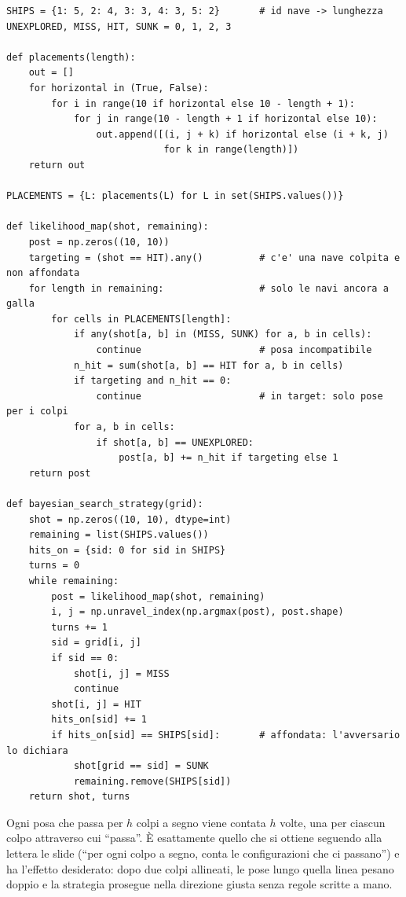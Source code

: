 \begin{lstlisting}
SHIPS = {1: 5, 2: 4, 3: 3, 4: 3, 5: 2}       # id nave -> lunghezza
UNEXPLORED, MISS, HIT, SUNK = 0, 1, 2, 3

def placements(length):
    out = []
    for horizontal in (True, False):
        for i in range(10 if horizontal else 10 - length + 1):
            for j in range(10 - length + 1 if horizontal else 10):
                out.append([(i, j + k) if horizontal else (i + k, j)
                            for k in range(length)])
    return out

PLACEMENTS = {L: placements(L) for L in set(SHIPS.values())}

def likelihood_map(shot, remaining):
    post = np.zeros((10, 10))
    targeting = (shot == HIT).any()          # c'e' una nave colpita e non affondata
    for length in remaining:                 # solo le navi ancora a galla
        for cells in PLACEMENTS[length]:
            if any(shot[a, b] in (MISS, SUNK) for a, b in cells):
                continue                     # posa incompatibile
            n_hit = sum(shot[a, b] == HIT for a, b in cells)
            if targeting and n_hit == 0:
                continue                     # in target: solo pose per i colpi
            for a, b in cells:
                if shot[a, b] == UNEXPLORED:
                    post[a, b] += n_hit if targeting else 1
    return post

def bayesian_search_strategy(grid):
    shot = np.zeros((10, 10), dtype=int)
    remaining = list(SHIPS.values())
    hits_on = {sid: 0 for sid in SHIPS}
    turns = 0
    while remaining:
        post = likelihood_map(shot, remaining)
        i, j = np.unravel_index(np.argmax(post), post.shape)
        turns += 1
        sid = grid[i, j]
        if sid == 0:
            shot[i, j] = MISS
            continue
        shot[i, j] = HIT
        hits_on[sid] += 1
        if hits_on[sid] == SHIPS[sid]:       # affondata: l'avversario lo dichiara
            shot[grid == sid] = SUNK
            remaining.remove(SHIPS[sid])
    return shot, turns
\end{lstlisting}

\begin{osservazione}
Ogni posa che passa per $h$ colpi a segno viene contata $h$ volte, una per ciascun colpo
attraverso cui ``passa''. È esattamente quello che si ottiene seguendo alla lettera le
slide (``per ogni colpo a segno, conta le configurazioni che ci passano'') e ha l'effetto
desiderato: dopo due colpi allineati, le pose lungo quella linea pesano doppio e la
strategia prosegue nella direzione giusta senza regole scritte a mano.
\end{osservazione}


